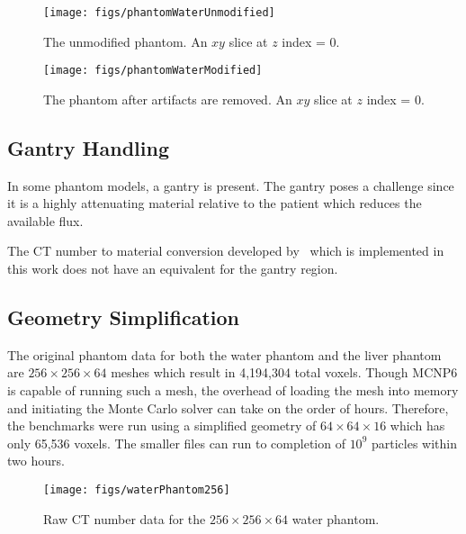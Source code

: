 \begin{figure}[tb]
  \begin{center}
   \texttt{[image: figs/phantomWaterUnmodified]}
  \end{center}
  \caption{The unmodified phantom. An $xy$ slice at $z$ index = 0.}
\label{fig:phantomWaterUnmodified}
\end{figure}

\begin{figure}[tb]
  \begin{center}
   \texttt{[image: figs/phantomWaterModified]}
  \end{center}
  \caption{The phantom after artifacts are removed. An $xy$ slice at $z$ index = 0.}
\label{fig:phantomWaterModified}
\end{figure}



\subsection{Gantry Handling}
In some phantom models, a gantry is present. The gantry poses a challenge since it is a highly attenuating material relative to the patient which reduces the available flux.

The CT number to material conversion developed by~\cite{ref:ottossonr} which is implemented in this work does not have an equivalent for the gantry region.

\subsection{Geometry Simplification}
The original phantom data for both the water phantom and the liver phantom are $256\times256\times64$ meshes which result in 4,194,304 total voxels. Though MCNP6 is capable of running such a mesh, the overhead of loading the mesh into memory and initiating the Monte Carlo solver can take on the order of hours. Therefore, the benchmarks were run using a simplified geometry of $64\times64\times16$ which has only 65,536 voxels. The smaller files can run to completion of $10^9$ particles within two hours.

\begin{figure}[tb]
  \begin{center}
   \texttt{[image: figs/waterPhantom256]}
  \end{center}
  \caption{Raw CT number data for the $256 \times 256 \times 64$ water phantom.}
\label{fig:waterPhantom256}
\end{figure}

